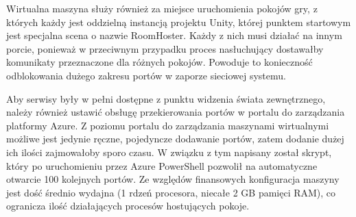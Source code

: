Wirtualna maszyna służy również za miejsce uruchomienia pokojów gry, z których każdy jest oddzielną instancją projektu Unity, której punktem startowym jest specjalna scena o nazwie RoomHoster. Każdy z nich musi działać na innym porcie, ponieważ w przeciwnym przypadku proces nasłuchujący dostawałby komunikaty przeznaczone dla różnych pokojów. Powoduje to konieczność odblokowania dużego zakresu portów w zaporze sieciowej systemu.

Aby serwisy były w pełni dostępne z punktu widzenia świata zewnętrznego, należy również ustawić obsługę przekierowania portów w portalu do zarządzania platformy Azure. Z poziomu portalu do zarządzania maszynami wirtualnymi możliwe jest jedynie ręczne, pojedyncze dodawanie portów, zatem dodanie dużej ich ilości zajmowałoby sporo czasu. W związku z tym napisany został skrypt, który po uruchomieniu przez Azure PowerShell pozwolił na automatyczne otwarcie 100 kolejnych portów. Ze względów finansowych konfiguracja maszyny jest dość średnio wydajna (1 rdzeń procesora, niecałe 2 GB pamięci RAM), co ogranicza ilość działających procesów hostujących pokoje.